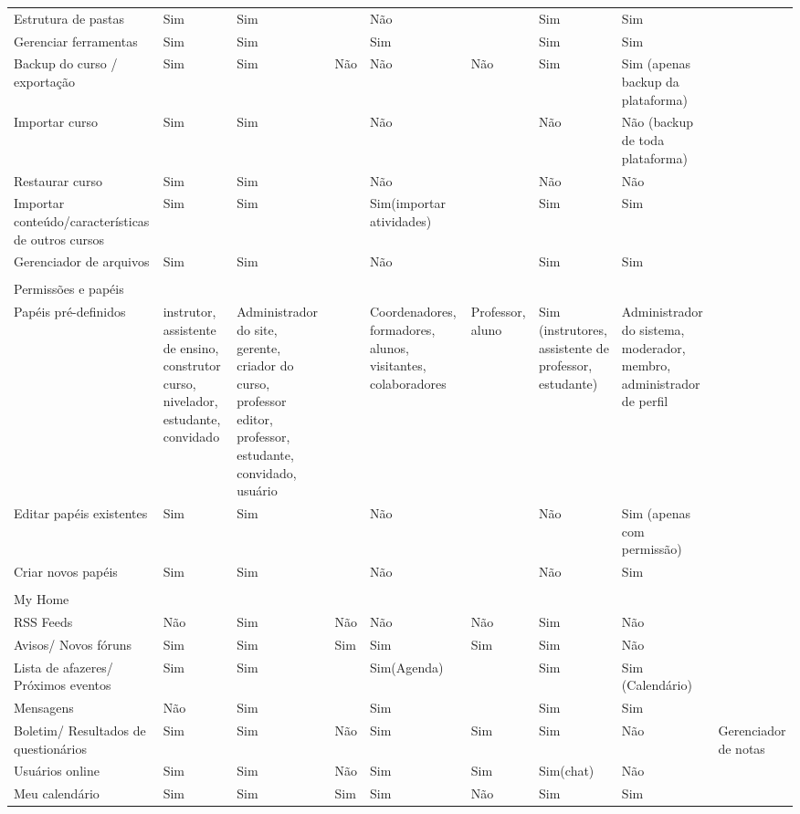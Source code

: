 \begin{table}[h]
\begin{tabular}{@{}lllllllll@{}}
Estrutura de pastas & Sim & Sim &  & Não &  & Sim & Sim &  \\
Gerenciar ferramentas & Sim & Sim &  & Sim &  & Sim & Sim &  \\
Backup do curso / exportação & Sim & Sim & Não & Não & Não & Sim & Sim (apenas backup da plataforma) &  \\
Importar curso & Sim & Sim &  & Não &  & Não & Não (backup de toda plataforma) &  \\
Restaurar curso & Sim & Sim &  & Não &  & Não & Não &  \\
Importar conteúdo/características de outros cursos & Sim & Sim &  & Sim(importar atividades) &  & Sim & Sim &  \\
Gerenciador de arquivos & Sim & Sim &  & Não &  & Sim & Sim &  \\
 &  &  &  &  &  &  &  &  \\
Permissões e papéis &  &  &  &  &  &  &  &  \\
Papéis pré-definidos & instrutor, assistente de ensino, construtor curso, nivelador, estudante, convidado & Administrador do site, gerente, criador do curso, professor editor, professor, estudante, convidado, usuário &  & Coordenadores, formadores, alunos, visitantes, colaboradores & Professor, aluno & Sim (instrutores, assistente de professor, estudante) & Administrador do sistema, moderador, membro, administrador de perfil &  \\
Editar papéis existentes & Sim & Sim &  & Não &  & Não & Sim (apenas com permissão) &  \\
Criar novos papéis & Sim & Sim &  & Não &  & Não & Sim &  \\
 &  &  &  &  &  &  &  &  \\
My Home &  &  &  &  &  &  &  &  \\
RSS Feeds & Não & Sim & Não & Não & Não & Sim & Não &  \\
Avisos/ Novos fóruns & Sim & Sim & Sim & Sim & Sim & Sim & Não &  \\
Lista de afazeres/ Próximos eventos & Sim & Sim &  & Sim(Agenda) &  & Sim & Sim (Calendário) &  \\
Mensagens & Não & Sim &  & Sim &  & Sim & Sim &  \\
Boletim/ Resultados de questionários & Sim & Sim & Não & Sim & Sim & Sim & Não & Gerenciador de notas \\
Usuários online & Sim & Sim & Não & Sim & Sim & Sim(chat) & Não &  \\
Meu calendário & Sim & Sim & Sim & Sim & Não & Sim & Sim &  \\

\end{tabular}
\end{table}
